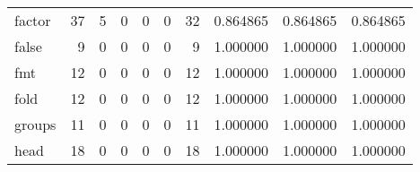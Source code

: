 \begin{tabular}{lrrrrrrrrr}
factor    &                                      37 &                                                  5 &                                                  0 &                                                  0 &                                                  0 &                                                 32 &                                           0.864865 &                               0.864865 &                             0.864865 \\
false     &                                       9 &                                                  0 &                                                  0 &                                                  0 &                                                  0 &                                                  9 &                                           1.000000 &                               1.000000 &                             1.000000 \\
fmt       &                                      12 &                                                  0 &                                                  0 &                                                  0 &                                                  0 &                                                 12 &                                           1.000000 &                               1.000000 &                             1.000000 \\
fold      &                                      12 &                                                  0 &                                                  0 &                                                  0 &                                                  0 &                                                 12 &                                           1.000000 &                               1.000000 &                             1.000000 \\
groups    &                                      11 &                                                  0 &                                                  0 &                                                  0 &                                                  0 &                                                 11 &                                           1.000000 &                               1.000000 &                             1.000000 \\
head      &                                      18 &                                                  0 &                                                  0 &                                                  0 &                                                  0 &                                                 18 &                                           1.000000 &                               1.000000 &                             1.000000 \\

\end{tabular}
